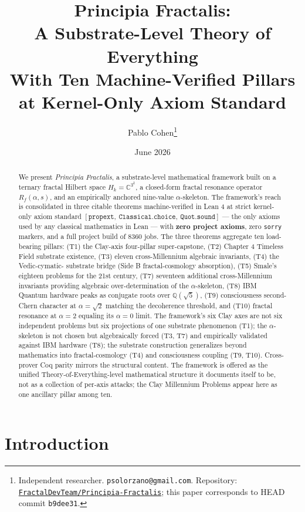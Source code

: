 \documentclass[11pt,a4paper]{article}
\title{Principia Fractalis:\\
A Substrate-Level Theory of Everything\\[0.3em]
\large With Ten Machine-Verified Pillars at Kernel-Only Axiom Standard}
\author{Pablo Cohen\thanks{Independent researcher. \texttt{psolorzano@gmail.com}.
Repository: \href{https://github.com/FractalDevTeam/Principia-Fractalis}%
{\texttt{FractalDevTeam/Principia-Fractalis}}; this paper corresponds
to HEAD commit \texttt{b9dee31}.}}
\date{June 2026}
\theoremstyle{definition}
\begin{document}
\maketitle

\begin{abstract}
We present \emph{Principia Fractalis}, a substrate-level
mathematical framework built on a ternary fractal Hilbert space
$H_k = \mathbb{C}^{3^k}$, a closed-form fractal resonance operator
$R_f(\alpha, s)$, and an empirically anchored nine-value
$\alpha$-skeleton. The framework's reach is consolidated in three
citable theorems machine-verified in Lean 4 at strict
kernel-only axiom standard
$[\texttt{propext},\ \texttt{Classical.choice},\ \texttt{Quot.sound}]$
--- the only axioms used by any classical mathematics in Lean ---
with \textbf{zero project axioms}, zero \texttt{sorry} markers, and a
full project build of 8360 jobs. The three theorems aggregate ten
load-bearing pillars: (T1) the Clay-axis four-pillar super-capstone,
(T2) Chapter 4 Timeless Field substrate existence, (T3) eleven
cross-Millennium algebraic invariants, (T4) the Vedic-cymatic-
substrate bridge (Side B fractal-cosmology absorption), (T5) Smale's
eighteen problems for the 21st century, (T7) seventeen additional
cross-Millennium invariants providing algebraic over-determination
of the $\alpha$-skeleton, (T8) IBM Quantum hardware peaks as
conjugate roots over $\mathbb{Q}(\sqrt{5})$, (T9) consciousness
second-Chern character at $\alpha = \sqrt{2}$ matching the
decoherence threshold, and (T10) fractal resonance at $\alpha = 2$
equaling its $\alpha = 0$ limit. The framework's six Clay axes are
not six independent problems but six projections of one substrate
phenomenon (T1); the $\alpha$-skeleton is not chosen but
algebraically forced (T3, T7) and empirically validated against IBM
hardware (T8); the substrate construction generalizes beyond
mathematics into fractal-cosmology (T4) and consciousness coupling
(T9, T10). Cross-prover Coq parity mirrors the structural content.
The framework is offered as the unified Theory-of-Everything-level
mathematical structure it documents itself to be, not as a
collection of per-axis attacks; the Clay Millennium Problems appear
here as one ancillary pillar among ten.
\end{abstract}

\section{Introduction}
\label{sec:intro}
\end{document}
